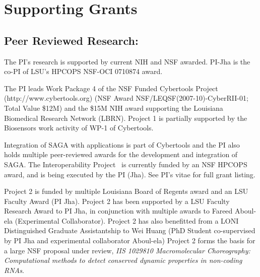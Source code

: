 \documentclass[a4paper,10pt]{article}
\begin{document}


\section*{Supporting Grants}






\subsection{Peer Reviewed Research:} The PI's research is supported by current NIH and NSF awarded.  PI-Jha is the co-PI of LSU's HPCOPS NSF-OCI 0710874 award.  


The PI leads Work Package 4 of the NSF Funded Cybertools Project (http://www.cybertools.org) (NSF Award NSF/LEQSF(2007-10)-CyberRII-01; Total Value \$12M) and the \$15M NIH award supporting the Louisiana Biomedical Research Network (LBRN). Project 1 is partially supported by the Biosensors work activity of WP-1 of Cybertools.

Integration of SAGA with applications is part of Cybertools and the PI also holds multiple peer-reviewed awards for the development and integration of SAGA.  The Interoperability Project~\cite{interop_url} is currently funded by an NSF HPCOPS award, and is being executed by the PI (Jha).  See PI's vitae for full grant listing.

Project 2 is funded by multiple Louisiana Board of Regents award and an LSU Faculty Award (PI Jha). Project 2 has been supported by a LSU Faculty Research Award to PI Jha, in conjunction with multiple awards to Fareed Aboul-ela (Experimental Collaborator). Project 2 has also benefitted from a LONI Distinguished Graduate Assistantship to Wei Huang (PhD Student co-supervised by PI Jha and experimental collaborator Aboul-ela) Project 2 forms the basis for a large NSF proposal under review, {\it IIS 1029810 Macromolecular Choreography: Computational methods to detect conserved dynamic properties in non-coding RNAs}.
\end{document}
